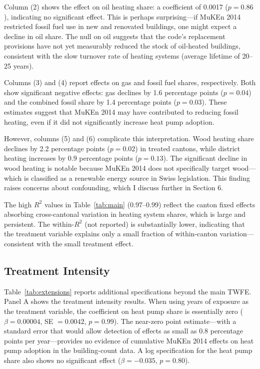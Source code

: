 \documentclass[12pt]{article}
\begin{document}
Column (2) shows the effect on oil heating share: a coefficient of 0.0017 ($p = 0.86$), indicating no significant effect. This is perhaps surprising---if MuKEn 2014 restricted fossil fuel use in new and renovated buildings, one might expect a decline in oil share. The null on oil suggests that the code's replacement provisions have not yet measurably reduced the stock of oil-heated buildings, consistent with the slow turnover rate of heating systems (average lifetime of 20--25 years).

Columns (3) and (4) report effects on gas and fossil fuel shares, respectively. Both show significant negative effects: gas declines by 1.6 percentage points ($p = 0.04$) and the combined fossil share by 1.4 percentage points ($p = 0.03$). These estimates suggest that MuKEn 2014 may have contributed to reducing fossil heating, even if it did not significantly increase heat pump adoption.

However, columns (5) and (6) complicate this interpretation. Wood heating share declines by 2.2 percentage points ($p = 0.02$) in treated cantons, while district heating increases by 0.9 percentage points ($p = 0.13$). The significant decline in wood heating is notable because MuKEn 2014 does not specifically target wood---which is classified as a renewable energy source in Swiss legislation. This finding raises concerns about confounding, which I discuss further in Section 6.

The high $R^2$ values in Table~\ref{tab:main} (0.97--0.99) reflect the canton fixed effects absorbing cross-cantonal variation in heating system shares, which is large and persistent. The within-$R^2$ (not reported) is substantially lower, indicating that the treatment variable explains only a small fraction of within-canton variation---consistent with the small treatment effect.



\subsection{Treatment Intensity}

Table~\ref{tab:extensions} reports additional specifications beyond the main TWFE. Panel A shows the treatment intensity results. When using years of exposure as the treatment variable, the coefficient on heat pump share is essentially zero ($\beta = 0.00004$, SE $= 0.0042$, $p = 0.99$). The near-zero point estimate---with a standard error that would allow detection of effects as small as 0.8 percentage points per year---provides no evidence of cumulative MuKEn 2014 effects on heat pump adoption in the building-count data. A log specification for the heat pump share also shows no significant effect ($\beta = -0.035$, $p = 0.80$).
\end{document}
